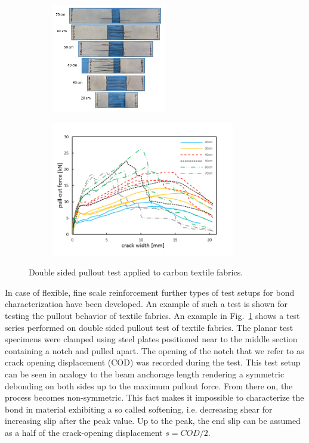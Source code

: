 \documentclass[main.tex]{subfiles}
\begin{document}
\begin{figure}[tb]
	\centering
	\begin{subfigure}{0.45\textwidth}
	\centering
  \includegraphics[width=5cm]{fig/Lecture02/_300___failure_modes.png}
	\end{subfigure}
	\begin{subfigure}{0.5\textwidth}
	\centering
  \includegraphics[width=8cm]{fig/Lecture02/_300___test_carbon.png}
	\end{subfigure}
	\caption{Double sided pullout test applied to carbon textile fabrics.}
	\label{fig:double_sided_po_test}
\end{figure}


In case of flexible, fine scale reinforcement further types of test setups 
for bond characterization have been developed. An example of such a test is 
shown for testing the pullout behavior of textile fabrics. An example in Fig.~\ref{fig:double_sided_po_test} shows a test series performed on 
double sided pullout test of textile fabrics. The planar test specimens
were clamped using steel plates positioned near to the middle section 
containing a notch and pulled apart. The opening of the notch that we refer to as crack opening displacement (COD) was recorded during the test. This test setup can be seen in analogy 
to the beam anchorage length rendering a symmetric debonding on both sides up to the maximum
pullout force. From there on, the process becomes non-symmetric. This fact makes it impossible
to characterize the bond in material exhibiting a so called softening, i.e. decreasing shear
for increasing slip after the peak value. Up to the peak, the end slip 
can be assumed as a half of the crack-opening displacement $s = COD/2$. 
\end{document}

